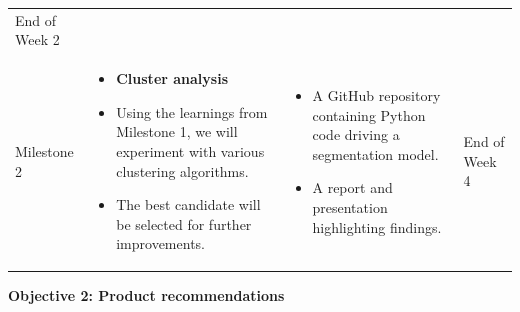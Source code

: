 \documentclass[
]{book}
\providecommand{\tightlist}{%
  \setlength{\itemsep}{0pt}\setlength{\parskip}{0pt}}
\begin{document}
\begin{longtable}[]{@{}llll@{}}
\begin{minipage}[t]{0.15\columnwidth}
End of Week 2\strut
\end{minipage}\tabularnewline
\begin{minipage}[t]{0.14\columnwidth}\raggedright
Milestone 2\strut
\end{minipage} & \begin{minipage}[t]{0.30\columnwidth}\raggedright
\begin{itemize}
\tightlist
\item
  \textbf{Cluster analysis}
\item
  Using the learnings from Milestone 1, we will experiment with various
  clustering algorithms.
\item
  The best candidate will be selected for further improvements.
\end{itemize}\strut
\end{minipage} & \begin{minipage}[t]{0.30\columnwidth}\raggedright
\begin{itemize}
\tightlist
\item
  A GitHub repository containing Python code driving a segmentation
  model.
\item
  A report and presentation highlighting findings.
\end{itemize}\strut
\end{minipage} & \begin{minipage}[t]{0.15\columnwidth}\raggedright
End of Week 4\strut
\end{minipage}\tabularnewline
\bottomrule
\end{longtable}

\textbf{Objective 2: Product recommendations}
\end{document}
